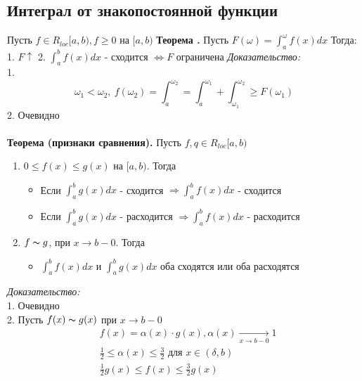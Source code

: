 \documentclass{article}
\newcommand*{\theorem}[2]{\textbf{Теорема #1. } #2 \newline}
\begin{document}
\subsection{Интеграл от знакопостоянной функции}
Пусть $f \in R_{loc}[a, b), f \geq 0 $ на $[a, b)$
\theorem{}{Пусть $F(\omega) = \int_{a}^{\omega} f(x)dx$
    Тогда:
    1. $F \uparrow$
    2. $\int_{a}^{b} f(x)dx$ - сходится $\Leftrightarrow F$ ограничена 
}
\textit{Доказательство: \\}
1.
$$
    \omega_1 < \omega_2,\  f(\omega_2) = \int_{a}^{\omega_2} = \int_{a}^{\omega_1} + \int_{\omega_1}^{\omega_2} \geq F(\omega_1)
$$
2. Очевидно \\\\
\theorem{(признаки сравнения)} {}
Пусть $f, q \in R_{loc}[a, b)$
\begin{enumerate}
    \item {$0 \leq f(x) \leq g(x) $ на $[a, b)$. Тогда
        \begin{itemize}
            \item Если $\int_{a}^{b} g(x)dx$ - сходится $\Rightarrow \int_{a}^{b} f(x)dx$ - сходится
            \item Если $\int_{a}^{b} g(x)dx$ - расходится $\Rightarrow \int_{a}^{b} f(x)dx$ - расходится
        \end{itemize}
    }
    \item {$f \thicksim g$, при $x \to b - 0$. Тогда
        \begin{itemize}
            \item $\int_{a}^{b} f(x)dx$ и $\int_{a}^{b} g(x)dx$ оба сходятся или оба расходятся 
        \end{itemize}
    }
\end{enumerate}
\textit{Доказательство: \\}
1. Очевидно \\
2. Пусть $f(x) \thicksim g(x)$ при $x \to b - 0$
\begin{align*}
    &f(x) = \alpha(x) \cdot g(x), \alpha(x)\xrightarrow[x \to b - 0]{} 1\\
    &\frac{1}{2} \leq \alpha(x) \leq \frac{3}{2} \text{ для } x \in (\delta, b)\\
    &\frac{1}{2} g(x) \leq f(x) \leq \frac{3}{2} g(x)
\end{align*}
\end{document}
